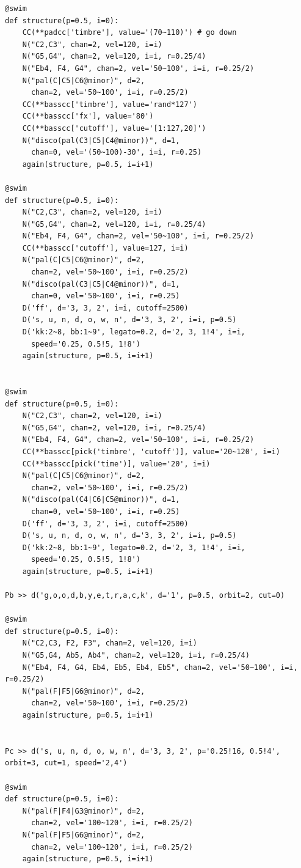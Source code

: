 \documentclass[11pt]{article}
\begin{document}
\begin{enumerate}
\begin{verbatim}
@swim
def structure(p=0.5, i=0):
    CC(**padcc['timbre'], value='(70~110)') # go down
    N("C2,C3", chan=2, vel=120, i=i)
    N("G5,G4", chan=2, vel=120, i=i, r=0.25/4)
    N("Eb4, F4, G4", chan=2, vel='50~100', i=i, r=0.25/2)
    N("pal(C|C5|C6@minor)", d=2,
      chan=2, vel='50~100', i=i, r=0.25/2)
    CC(**basscc['timbre'], value='rand*127')
    CC(**basscc['fx'], value='80')
    CC(**basscc['cutoff'], value='[1:127,20]')
    N("disco(pal(C3|C5|C4@minor))", d=1,
      chan=0, vel='(50~100)-30', i=i, r=0.25)
    again(structure, p=0.5, i=i+1)

@swim
def structure(p=0.5, i=0):
    N("C2,C3", chan=2, vel=120, i=i)
    N("G5,G4", chan=2, vel=120, i=i, r=0.25/4)
    N("Eb4, F4, G4", chan=2, vel='50~100', i=i, r=0.25/2)
    CC(**basscc['cutoff'], value=127, i=i)
    N("pal(C|C5|C6@minor)", d=2,
      chan=2, vel='50~100', i=i, r=0.25/2)
    N("disco(pal(C3|C5|C4@minor))", d=1,
      chan=0, vel='50~100', i=i, r=0.25)
    D('ff', d='3, 3, 2', i=i, cutoff=2500)
    D('s, u, n, d, o, w, n', d='3, 3, 2', i=i, p=0.5)
    D('kk:2~8, bb:1~9', legato=0.2, d='2, 3, 1!4', i=i,
      speed='0.25, 0.5!5, 1!8')
    again(structure, p=0.5, i=i+1)


@swim
def structure(p=0.5, i=0):
    N("C2,C3", chan=2, vel=120, i=i)
    N("G5,G4", chan=2, vel=120, i=i, r=0.25/4)
    N("Eb4, F4, G4", chan=2, vel='50~100', i=i, r=0.25/2)
    CC(**basscc[pick('timbre', 'cutoff')], value='20~120', i=i)
    CC(**basscc[pick('time')], value='20', i=i)
    N("pal(C|C5|C6@minor)", d=2,
      chan=2, vel='50~100', i=i, r=0.25/2)
    N("disco(pal(C4|C6|C5@minor))", d=1,
      chan=0, vel='50~100', i=i, r=0.25)
    D('ff', d='3, 3, 2', i=i, cutoff=2500)
    D('s, u, n, d, o, w, n', d='3, 3, 2', i=i, p=0.5)
    D('kk:2~8, bb:1~9', legato=0.2, d='2, 3, 1!4', i=i,
      speed='0.25, 0.5!5, 1!8')
    again(structure, p=0.5, i=i+1)

Pb >> d('g,o,o,d,b,y,e,t,r,a,c,k', d='1', p=0.5, orbit=2, cut=0)

@swim
def structure(p=0.5, i=0):
    N("C2,C3, F2, F3", chan=2, vel=120, i=i)
    N("G5,G4, Ab5, Ab4", chan=2, vel=120, i=i, r=0.25/4)
    N("Eb4, F4, G4, Eb4, Eb5, Eb4, Eb5", chan=2, vel='50~100', i=i, r=0.25/2)
    N("pal(F|F5|G6@minor)", d=2,
      chan=2, vel='50~100', i=i, r=0.25/2)
    again(structure, p=0.5, i=i+1)


Pc >> d('s, u, n, d, o, w, n', d='3, 3, 2', p='0.25!16, 0.5!4', orbit=3, cut=1, speed='2,4')

@swim
def structure(p=0.5, i=0):
    N("pal(F|F4|G3@minor)", d=2,
      chan=2, vel='100~120', i=i, r=0.25/2)
    N("pal(F|F5|G6@minor)", d=2,
      chan=2, vel='100~120', i=i, r=0.25/2)
    again(structure, p=0.5, i=i+1)


\end{verbatim}
\end{enumerate}
\end{document}
